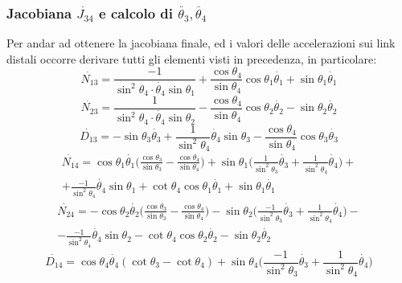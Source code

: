 \subsubsection{Jacobiana $\dot{J_{34}}$ e calcolo di $\ddot{\theta_3}, \ddot{\theta_4}$}
Per andar ad ottenere la jacobiana finale, ed i valori delle accelerazioni sui link distali occorre derivare tutti gli elementi visti in precedenza, in particolare:
\begin{equation*} %
    \dot{N_{13}} = \frac{-1}{\sin^2\theta_4\cdot\dot{\theta_4}\sin\theta_1}+\frac{\cos\theta_4}{\sin\theta_4}\cos\theta_1\dot{\theta_1}+\sin\theta_1\dot{\theta_1}
\end{equation*}
\begin{equation*} %
   \dot{N_{23}} =\frac{1}{\sin^2\theta_4\cdot\dot{\theta_4}\sin\theta_2}-\frac{\cos\theta_4}{\sin\theta_4}\cos\theta_2\dot{\theta_2}-\sin\theta_2\dot{\theta_2}
\end{equation*}
\begin{equation*} %
  \dot{D_{13}} =  -\sin\theta_3\dot{\theta_3} + \frac{1}{\sin^2\theta_4}\dot{\theta_4}\sin\theta_3 -\frac{ \cos\theta_4} {\sin\theta_4}\cos\theta_3\dot{\theta_3}
\end{equation*}
\begin{equation*} %
\begin{aligned}
    \dot{N_{14}} = \cos\theta_1\dot{\theta_1}\bigg(\frac{\cos\theta_3}{\sin\theta_3}-\frac{\cos\theta_4}{\sin\theta_4}\bigg) + \sin\theta_1\bigg(\frac{1}{\sin^2\theta_3}\dot{\theta_3}+\frac{1}{\sin^2\theta_4}\dot{\theta_4}\bigg)+\\+\frac{-1}{\sin^2\theta_4}\dot{\theta_4}\sin\theta_1 +\cot\theta_4\cos\theta_1\dot{\theta_1}+\sin\theta_1\dot{\theta_1}
    \end{aligned}
\end{equation*}
\begin{equation*} %
    \begin{aligned}
    \dot{N_{24}} = -\cos\theta_2\dot{\theta_2}\bigg(\frac{\cos\theta_3}{\sin\theta_3} - \frac{\cos\theta_4}{\sin\theta_4} \bigg) - \sin\theta_2\bigg(\frac{-1}{\sin^2\theta_3}\dot{\theta_3} + \frac{1}{\sin^2\theta_4}\dot{\theta_4}\bigg) -\\
    - \frac{-1}{\sin^2\theta_4}\dot{\theta_4}\sin\theta_2-\cot\theta_4\cos\theta_2\dot{\theta_2}-\sin\theta_2\dot{\theta_2}
    \end{aligned}
\end{equation*}
\begin{equation*} %
   \dot{D_{14}} = \cos\theta_4\dot{\theta_4}(\cot\theta_3-\cot\theta_4)+\sin\theta_4\bigg(\frac{-1}{\sin^2\theta_3}\dot{\theta_3} + \frac{1}{\sin^2\theta_4}\dot{\theta_4}\bigg)
\end{equation*}
